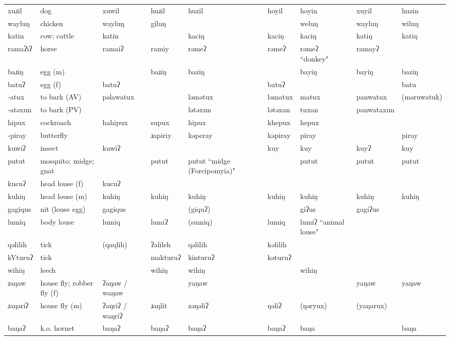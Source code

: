 \begin{landscape}
\begin{longtable}{*{9}{p{}}}
\text{*}xuɹil & dog & xuwil & huɹil & huzil & hoyil & hoyin & xuyil & huzin\\
\text{*}wayluŋ & chicken & wayluŋ & giluŋ &  &  & weluŋ & wayluŋ & wiluŋ\\
\text{*}katin & cow; cattle & katin &  & kaciŋ & kaciŋ & kaciŋ & katiŋ & katiŋ\\
\text{*}ramaʔiʔ & horse & ramaiʔ & ramiy & rəmeʔ & rəmeʔ & rəmeʔ ``donkey" & ramayʔ & \\
\text{*}baɹiŋ & egg (m) &  & baɹiŋ & baziŋ &  & bayiŋ & bayiŋ & baziŋ\\
\text{*}batuʔ & egg (f) & batuʔ &  &  & batuʔ &  &  & batu\\
\text{*}-atux & to bark (AV) & pəlawatux &  & ləmətux & ləmatux & matux & panwatux & (məruwatuk)\\
\text{*}-atəxun & to bark (PV) &  &  & lətəxun & lətəxan & tuxan & panwataxun & \\
\text{*}hipux & cockroach & hahipux & supux & hipux & khepux & hepux &  & \\
\text{*}-piray & butterfly &  & ɹapiriy & kəperay & kəpiray & piray &  & piray\\
\text{*}kuwiʔ & insect & kuwiʔ &  &  & kuy & kuy & kuyʔ & kuy\\
\text{*}putut & mosquito; midge; gnat &  & putut & putut ``midge (Forcipomyia)" &  & putut & putut & putut\\
\text{*}kucuʔ & head louse (f) & kucuʔ &  &  &  &  &  & \\
\text{*}kuhiŋ & head louse (m) & kuhiŋ & kuhiŋ & kuhiŋ & kuhiŋ & kuhiŋ & kuhiŋ & kuhiŋ\\
\text{*}gagiqus & nit (louse egg) & gagiqus &  & (giquʔ) &  & giʔus & gagiʔus & \\
\text{*}lumiq & body louse & lumiq & lumiʔ & (sumiq) & lumiq & lumiʔ ``animal louse" &  & \\
\text{*}qəlilih & tick & (qaqlih) & ʔalileh & qəlilih & kəlilih &  &  & \\
\text{*}kVturuʔ & tick &  & makturuʔ & kinturuʔ & kəturuʔ &  &  & \\
\text{*}wihiŋ & leech &  & wihiŋ & wihiŋ &  & wihiŋ &  & \\
\text{*}ɹaŋaw & house fly; robber fly (f) & ʔaŋaw / waŋaw &  & yaŋaw &  &  & yaŋaw & yaŋaw\\
\text{*}ɹaŋəriʔ & house fly (m) & ʔaŋriʔ / waŋriʔ & ɹaŋlit & zəŋəliʔ & ŋəliʔ & (ŋəryux) & (yaŋarux) & \\
\text{*}baŋaʔ & k.o. hornet & baŋaʔ & baŋaʔ & baŋaʔ & baŋaʔ & baŋa &  & baŋa\\

\end{longtable}
\end{landscape}
